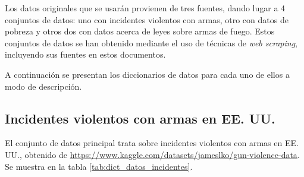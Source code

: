 \documentclass[11pt,a4paper]{article}
\begin{document}
Los datos originales que se usarán provienen de tres fuentes, dando lugar a 4 conjuntos de datos: uno con incidentes violentos con armas, otro con datos de pobreza y otros dos con datos acerca de leyes sobre armas de fuego. Estos conjuntos de datos se han obtenido mediante el uso de técnicas de \textit{web scraping}, incluyendo sus fuentes en estos documentos.

A continuación se presentan los diccionarios de datos para cada uno de ellos a modo de descripción.

\subsection*{Incidentes violentos con armas en EE. UU.}

El conjunto de datos principal trata sobre incidentes violentos con armas en EE. UU., obtenido de \url{https://www.kaggle.com/datasets/jameslko/gun-violence-data}. Se muestra en la tabla \ref{tab:dict_datos_incidentes}.
\end{document}
